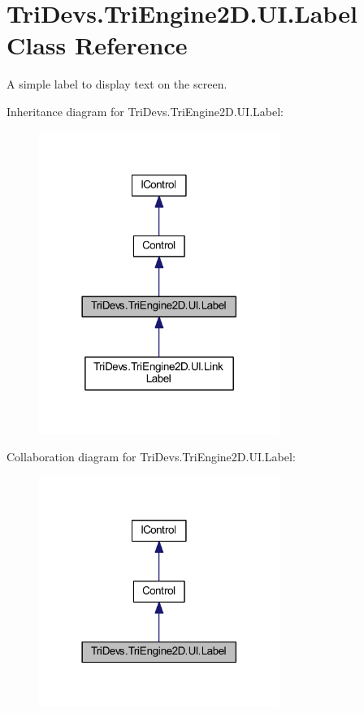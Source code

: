 \hypertarget{class_tri_devs_1_1_tri_engine2_d_1_1_u_i_1_1_label}{\section{Tri\-Devs.\-Tri\-Engine2\-D.\-U\-I.\-Label Class Reference}
\label{class_tri_devs_1_1_tri_engine2_d_1_1_u_i_1_1_label}
}


A simple label to display text on the screen.  




Inheritance diagram for Tri\-Devs.\-Tri\-Engine2\-D.\-U\-I.\-Label\-:\nopagebreak
\begin{figure}[H]
\begin{center}
\leavevmode
\includegraphics[width=222pt]{class_tri_devs_1_1_tri_engine2_d_1_1_u_i_1_1_label__inherit__graph}
\end{center}
\end{figure}


Collaboration diagram for Tri\-Devs.\-Tri\-Engine2\-D.\-U\-I.\-Label\-:\nopagebreak
\begin{figure}[H]
\begin{center}
\leavevmode
\includegraphics[width=222pt]{class_tri_devs_1_1_tri_engine2_d_1_1_u_i_1_1_label__coll__graph}
\end{center}
\end{figure}
